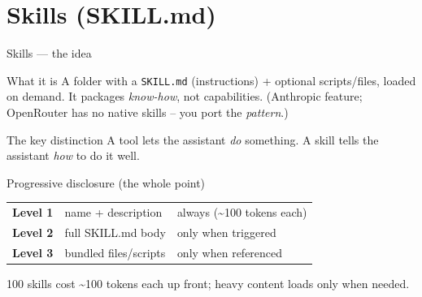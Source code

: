 \documentclass[aspectratio=169,10pt]{beamer}
\begin{document}
\section{Skills (SKILL.md)}

\begin{frame}{Skills --- the idea}
  \begin{block}{What it is}
    A folder with a \texttt{SKILL.md} (instructions) + optional scripts/files, loaded
    \alert{on demand}. It packages \emph{know-how}, not capabilities. (Anthropic feature;
    \alert{OpenRouter has no native skills} -- you port the \emph{pattern}.)
  \end{block}
  \begin{alertblock}{The key distinction}
    \footnotesize A \alert{tool} lets the assistant \emph{do} something. A \alert{skill} tells the assistant \emph{how} to do it well.
  \end{alertblock}
  \begin{block}{Progressive disclosure (the whole point)}
    \footnotesize
    \begin{tabular}{@{}lll@{}}
      \textbf{Level 1} & name + description & always (\textasciitilde100 tokens each) \\
      \textbf{Level 2} & full SKILL.md body & only when triggered \\
      \textbf{Level 3} & bundled files/scripts & only when referenced \\
    \end{tabular}
  \end{block}
  \footnotesize 100 skills cost \textasciitilde100 tokens each up front; heavy content loads only when needed.
\end{frame}
\end{document}
